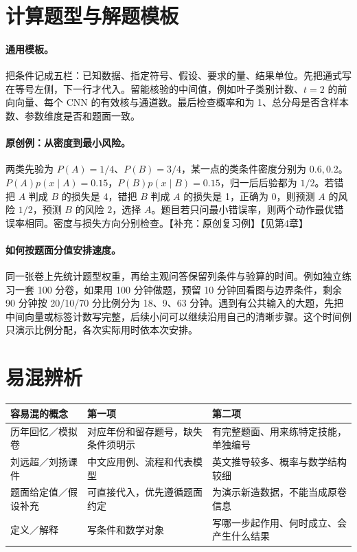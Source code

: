 \documentclass[UTF8,a4paper,zihao=-4,fontset=fandol]{ctexrep}
\begin{document}
\section{计算题型与解题模板}
\paragraph{通用模板。}
把条件记成五栏：已知数据、指定符号、假设、要求的量、结果单位。先把通式写在等号左侧，下一行才代入。留能核验的中间值，例如叶子类别计数、$t=2$ 的前向向量、每个 CNN 的有效核与通道数。最后检查概率和为 1、总分母是否含样本数、参数维度是否和题面一致。

\paragraph{原创例：从密度到最小风险。}
两类先验为 $P(A)=1/4$、$P(B)=3/4$，某一点的类条件密度分别为 $0.6,0.2$。\(P(A)p(x\mid A)=0.15\)，\(P(B)p(x\mid B)=0.15\)，归一后后验都为 $1/2$。若错把 $A$ 判成 $B$ 的损失是 4，错把 $B$ 判成 $A$ 的损失是 1，正确为 0，则预测 $A$ 的风险 $1/2$，预测 $B$ 的风险 $2$，选择 $A$。题目若只问最小错误率，则两个动作最优错误率相同。密度与损失方向分别检查。【补充：原创复习例】【见第4章】

\paragraph{如何按题面分值安排速度。}
同一张卷上先统计题型权重，再给主观问答保留列条件与验算的时间。例如独立练习一套 100 分卷，如果用 100 分钟做题，预留 10 分钟回看图与边界条件，剩余 90 分钟按 20/10/70 分比例分为 18、9、63 分钟。遇到有公共输入的大题，先把中间向量或标签计数写完整，后续小问可以继续沿用自己的清晰步骤。这个时间例只演示比例分配，各次实际用时依本次安排。

\section{易混辨析}
\begin{tabularx}{\linewidth}{@{}p{.24\linewidth}XX@{}}
\toprule
容易混的概念 & 第一项 & 第二项\\
\midrule
历年回忆／模拟卷 & 对应年份和留存题号，缺失条件须明示 & 有完整题面、用来练特定技能，单独编号\\
刘远超／刘扬课件 & 中文应用例、流程和代表模型 & 英文推导较多、概率与数学结构较细\\
题面给定值／假设补充 & 可直接代入，优先遵循题面约定 & 为演示新造数据，不能当成原卷信息\\
定义／解释 & 写条件和数学对象 & 写哪一步起作用、何时成立、会产生什么结果\\
\bottomrule
\end{tabularx}
\end{document}
